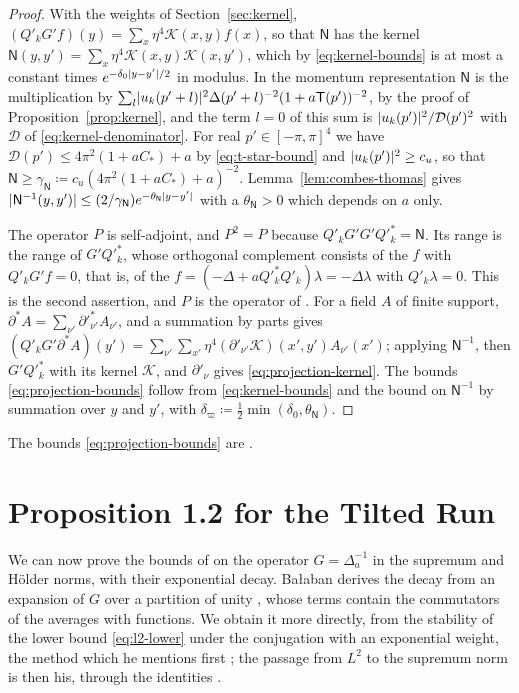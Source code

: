 \documentclass[11pt]{preprint}
\DeclarePairedDelimiter{\abs}{\lvert}{\rvert}
\numberwithin{equation}{section}
\theoremstyle{definition}
\theoremstyle{remark}
\theoremstyle{plain}
\begin{document}
\begin{proof}
With the weights of Section~\ref{sec:kernel}, $(Q'_kG'f)(y) = \sum_x\eta^4\mathcal K(x, y)f(x)$, so that $\mathsf N$ has the kernel $\mathsf N(y, y') = \sum_x\eta^4\mathcal K(x, y)\mathcal K(x, y')$, which by \eqref{eq:kernel-bounds} is at most a constant times $e^{-\delta_0\abs{y - y'}/2}$ in modulus. In the momentum representation $\mathsf N$ is the multiplication by $\sum_l\abs{u_k(p' + l)}^2\Delta(p' + l)^{-2}(1 + a\mathsf T(p'))^{-2}$, by the proof of Proposition~\ref{prop:kernel}, and the term $l = 0$ of this sum is $\abs{u_k(p')}^2/\mathcal D(p')^2$ with $\mathcal D$ of \eqref{eq:kernel-denominator}. For real $p' \in [-\pi, \pi]^4$ we have $\mathcal D(p') \leq 4\pi^2(1 + aC_*) + a$ by \eqref{eq:t-star-bound} and $\abs{u_k(p')}^2 \geq c_u$, so that $\mathsf N \geq \gamma_{\mathsf N} \coloneqq c_u(4\pi^2(1 + aC_*) + a)^{-2}$. Lemma~\ref{lem:combes-thomas} gives $\abs{\mathsf N^{-1}(y, y')} \leq (2/\gamma_{\mathsf N})e^{-\theta_{\mathsf N}\abs{y - y'}}$ with a $\theta_{\mathsf N} > 0$ which depends on $a$ only.

The operator $P$ is self-adjoint, and $P^2 = P$ because $Q'_kG'G'Q'^*_k = \mathsf N$. Its range is the range of $G'Q'^*_k$, whose orthogonal complement consists of the $f$ with $Q'_kG'f = 0$, that is, of the $f = (-\Delta + aQ'^*_kQ'_k)\lambda = -\Delta\lambda$ with $Q'_k\lambda = 0$. This is the second assertion, and $P$ is the operator of \cite[(1.38), (1.44)]{BalabanPRT1}. For a field $A$ of finite support, $\partial^*A = \sum_{\nu'}\partial'^*_{\nu'}A_{\nu'}$, and a summation by parts gives $(Q'_kG'\partial^*A)(y') = \sum_{\nu'}\sum_{x'}\eta^4(\partial'_{\nu'}\mathcal K)(x', y')A_{\nu'}(x')$; applying $\mathsf N^{-1}$, then $G'Q'^*_k$ with its kernel $\mathcal K$, and $\partial'_\nu$ gives \eqref{eq:projection-kernel}. The bounds \eqref{eq:projection-bounds} follow from \eqref{eq:kernel-bounds} and the bound on $\mathsf N^{-1}$ by summation over $y$ and $y'$, with $\delta_\varpi \coloneqq \frac12\min(\delta_0, \theta_{\mathsf N})$.
\end{proof}

The bounds \eqref{eq:projection-bounds} are \cite[(1.126), (1.127)]{BalabanPRT1}.

\section{Proposition 1.2 for the Tilted Run}\label{sec:proposition-one-two}

We can now prove the bounds of \cite[Proposition~1.2]{BalabanPRT1} on the operator $G = \Delta_a^{-1}$ in the supremum and H\"older norms, with their exponential decay. Ba{\l}aban derives the decay from an expansion of $G$ over a partition of unity \cite[(1.119)--(1.131)]{BalabanPRT1}, whose terms contain the commutators of the averages with functions. We obtain it more directly, from the stability of the lower bound \eqref{eq:l2-lower} under the conjugation with an exponential weight, the method which he mentions first \cite[p.~36]{BalabanPRT1}; the passage from $L^2$ to the supremum norm is then his, through the identities \cite[(1.132), (1.133)]{BalabanPRT1}.
\end{document}
